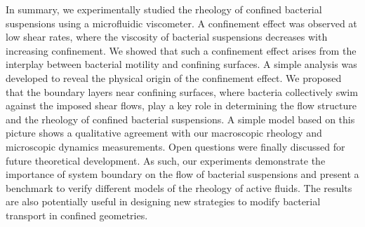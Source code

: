 In summary, we experimentally studied the rheology of confined bacterial suspensions using a microfluidic viscometer. A confinement
effect was observed at low shear rates, where the viscosity of bacterial suspensions decreases with increasing confinement. We showed that such a confinement effect arises from the interplay between bacterial motility and confining surfaces. A simple analysis was developed to reveal the physical origin of the confinement effect. We proposed that the boundary layers near confining surfaces, where bacteria collectively swim against the imposed shear flows, play a key role in determining the flow structure and the rheology of confined bacterial suspensions. A simple model based on this picture shows a qualitative agreement with our macroscopic rheology
and microscopic dynamics measurements. Open questions were finally discussed for future theoretical development. As such, our experiments demonstrate the importance of system boundary on the flow of bacterial suspensions and present a benchmark to verify different models of the rheology of active fluids. The results are also potentially useful in designing new strategies to modify bacterial transport in confined geometries.
